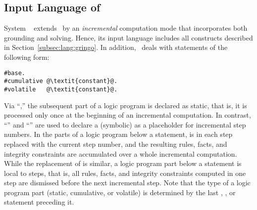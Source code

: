 \subsection{Input Language of \iclingo}\label{subsec:lang:iclingo}
%

System \iclingo~\cite{gekakaosscth08a} extends \clingo\ by an
\emph{incremental} computation mode that incorporates both grounding and solving.
Hence, its input language includes all constructs described
in Section~\ref{subsec:lang:gringo}.
In addition, \iclingo\ deals with statements of the following form:
%
\begin{lstlisting}[numbers=none,escapechar=@]
#base.
#cumulative @\textit{constant}@.
#volatile   @\textit{constant}@.
\end{lstlisting}
%
%
%
Via ``,''
the subsequent part of a logic program is declared as static, that is,
it is processed only once at the beginning of an incremental computation.
In contrast, ``''
and ``'' are used to declare
a (symbolic)  as a placeholder for incremental step numbers.
In the parts of a logic program below a  statement,
 is in each step replaced with the current step number,
and the resulting rules, facts, and integrity constraints are accumulated
over a whole incremental computation.
While the replacement of  is similar,
a logic program part below a  statement is local to steps,
that is, all rules, facts, and integrity constraints computed in one step
are dismissed before the next incremental step.
Note that the type of a logic program part (static, cumulative, or volatile)
is determined by the last
%
%
%
%
, , or  statement
preceding it.

